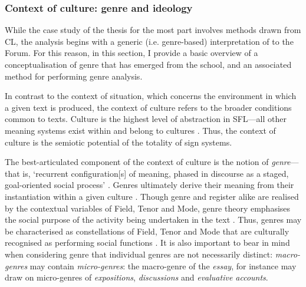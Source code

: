 


\subsubsection{Context of culture: genre and ideology} \label{sect:genre}

While the case study of the thesis for the most part involves methods drawn from \gls{CL}, the analysis begins with a generic (i.e. genre\hyp{}based) interpretation of  to the \gls{Forum}. For this reason, in this section, I provide a basic overview of a conceptualisation of genre that has emerged from the  school, and an associated method for performing genre analysis.


In contrast to the context of situation, which concerns the environment in which a given text is produced, the context of culture refers to the broader conditions common to texts. Culture is the highest level of abstraction in \gls{SFL}---all other meaning systems exist within and belong to cultures \cite{halliday_language_1989}. Thus, the context of culture is the semiotic potential of the totality of sign systems. 

The best\hyp{}articulated component of the context of culture is the notion of \emph{genre}---that is, `recurrent configuration[s] of meaning, phased in discourse as a staged, goal-oriented social process' \cite[p.~9]{martin_genre-based_2013}. Genres ultimately derive their meaning from their instantiation within a given culture \cite[p.~99]{halliday_language_1989}. Though genre and register alike are realised by the contextual variables of Field, Tenor and Mode, genre theory emphasises the social purpose of the activity being undertaken in the text \cite{christie_genre_2005,martin_english_1992}. Thus, genres may be characterised as constellations of Field, Tenor and Mode that are culturally recognised as performing social functions \cite{eggins_introduction_2004}. It is also important to bear in mind when considering genre that individual genres are not necessarily distinct: \emph{macro-genres} may contain \emph{micro-genres}: the macro-genre of the \emph{essay}, for instance may draw on micro-genres of \emph{expositions}, \emph{discussions} and \emph{evaluative accounts}.

